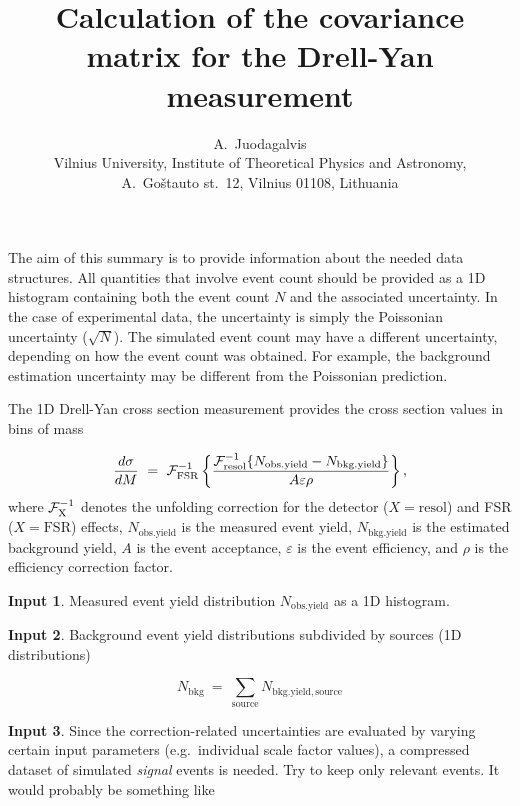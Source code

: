 \documentclass[a4paper]{article}
\title{Calculation of the covariance matrix for the Drell-Yan measurement}
\author{A.~Juodagalvis\\[2mm]
\small
Vilnius University, Institute of Theoretical Physics and Astronomy, \\
\small A.\ Go\v{s}tauto st.\ 12, Vilnius 01108, Lithuania}
\begin{document}
\linenumbers

\maketitle

The aim of this summary is to provide information about the needed
data structures. All quantities that involve event count should be
provided as a 1D histogram containing both the event count $N$ and the
associated uncertainty. In the case of experimental data, the
uncertainty is simply the Poissonian uncertainty ($\sqrt{N}$). The
simulated event count may have a different uncertainty, depending on
how the event count was obtained. For example, the background
estimation uncertainty may be different from the Poissonian prediction.

The 1D Drell-Yan cross section measurement provides the cross section
values in bins of mass

\begin{equation}
\frac{d\sigma}{dM}\ =\ {\cal F}^{-1}_\mathrm{FSR}
\left\{
\frac{
  {\cal F}^{-1}_\mathrm{resol}\{ N_\mathrm{obs.yield} - N_\mathrm{bkg.yield} \}
}{
  A \varepsilon \rho
}
\right\},
\end{equation}
where ${\cal F}^{-1}_\mathrm{X}$ denotes the unfolding correction for
the detector ($X=\mathrm{resol}$) and FSR ($X=\mathrm{FSR}$) effects,
$N_\mathrm{obs.yield}$ is the measured event yield,
$N_\mathrm{bkg.yield}$ is the estimated background yield, $A$ is the
event acceptance, $\varepsilon$ is the event efficiency, and $\rho$ is
the efficiency correction factor.

\medskip

{\bf Input 1}. Measured event yield distribution $N_\mathrm{obs.yield}$ as
a 1D histogram.

\medskip

{\bf Input 2}. Background event yield distributions subdivided by
sources (1D distributions)

\begin{equation}
N_\mathrm{bkg}\ =\ \sum\limits_\mathrm{source} N_\mathrm{bkg.yield,source}
\end{equation}

\medskip

{\bf Input 3}. Since the correction-related uncertainties are
evaluated by varying certain input parameters (e.g.\ individual scale
factor values), a compressed dataset of simulated \textit{signal}
events is needed. Try to keep only relevant events.
It would probably be something like
\end{document}
